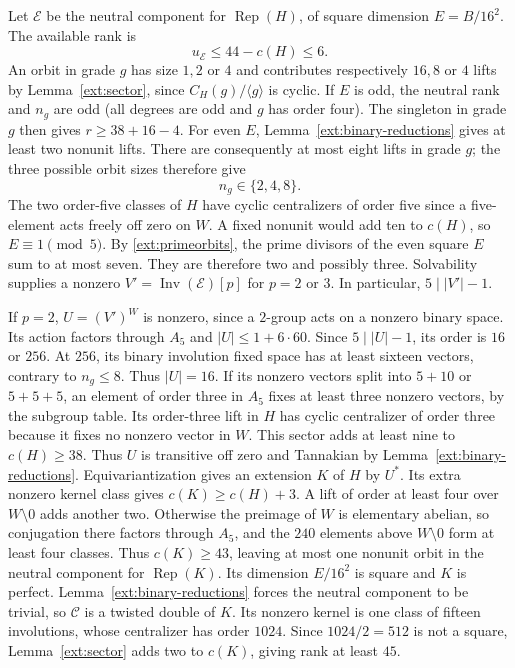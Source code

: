 \documentclass[11pt]{amsart}
\numberwithin{equation}{section}
\theoremstyle{definition}
\theoremstyle{plain}
\begin{document}
Let $\mathcal E$ be the neutral component for $\operatorname{Rep}(H)$,
of square dimension $E=B/16^2$. The available rank is
\begin{equation}\label{ext:kernel-budget}
 u_{\mathcal E}\le44-c(H)\le6.
\end{equation}
An orbit in grade $g$ has size $1,2$ or $4$ and contributes
respectively $16,8$ or $4$ lifts by Lemma~\ref{ext:sector}, since
$C_H(g)/\langle g\rangle$ is cyclic. If $E$ is odd, the neutral
rank and $n_g$ are odd (all degrees are odd and $g$ has order four).
The singleton in grade $g$ then gives $r\ge38+16-4$.
For even $E$, Lemma~\ref{ext:binary-reductions} gives at least two
nonunit lifts. There are consequently at most eight lifts in grade $g$;
the three possible orbit sizes therefore give
\begin{equation}\label{ext:kernel-fixed-bound}
 n_g\in\{2,4,8\}.
\end{equation}
The two order-five classes of $H$ have cyclic centralizers of order
five since a five-element acts freely off zero on $W$. A fixed
nonunit would add ten to $c(H)$, so $E\equiv1\pmod5$.
By \eqref{ext:primeorbits}, the prime divisors of the even square $E$
sum to at most seven. They are therefore two and possibly three. Solvability supplies a nonzero
$V'=\operatorname{Inv}(\mathcal E)[p]$ for $p=2$ or $3$.
In particular, $5\mid |V'|-1$.

If $p=2$, $U=(V')^W$ is nonzero, since a $2$-group acts on a
nonzero binary space. Its action factors through $A_5$ and
$|U|\le1+6\cdot60$. Since $5\mid |U|-1$, its order is $16$ or $256$.
At $256$, its binary involution fixed space has at least sixteen
vectors, contrary to $n_g\le8$. Thus $|U|=16$.
If its nonzero vectors split into $5+10$ or $5+5+5$, an element of
order three in $A_5$ fixes at least three nonzero vectors, by the
subgroup table. Its order-three lift in $H$ has cyclic centralizer of
order three because it fixes no nonzero vector in $W$. This sector
adds at least nine to $c(H)\ge38$. Thus $U$ is transitive off zero and Tannakian by
Lemma~\ref{ext:binary-reductions}. Equivariantization
gives an extension $K$ of $H$ by $U^*$. Its extra nonzero kernel
class gives $c(K)\ge c(H)+3$. A lift of order at least four over
$W\setminus0$ adds another two. Otherwise the preimage of $W$ is
elementary abelian, so conjugation there factors through $A_5$,
and the $240$ elements above $W\setminus0$ form at least four
classes. Thus $c(K)\ge43$, leaving at most one nonunit orbit in the
neutral component for $\operatorname{Rep}(K)$. Its dimension
$E/16^2$ is square and $K$ is perfect. Lemma~\ref{ext:binary-reductions} forces the neutral component to be trivial, so $\mathcal C$
is a twisted double of $K$. Its nonzero kernel is one class of fifteen involutions,
whose centralizer has order $1024$. Since $1024/2=512$ is not a square, Lemma~\ref{ext:sector} adds two
to $c(K)$, giving rank at least $45$.
\end{document}
